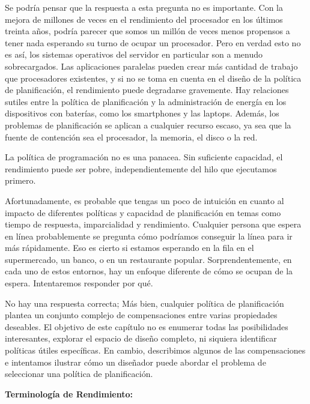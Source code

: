 \documentclass[10pt]{book}
\begin{document}
Se podría pensar que la respuesta a esta pregunta no es importante. Con la mejora de millones de veces en el rendimiento del procesador en los últimos treinta años, podría parecer que somos un millón de veces menos propensos a tener nada esperando su turno de ocupar un procesador. Pero en verdad esto no es así, los sistemas operativos del servidor en particular son a menudo sobrecargados. Las aplicaciones paralelas pueden crear más cantidad de trabajo que procesadores existentes, y si no se toma en cuenta en el diseño de la política de planificación, el rendimiento puede degradarse gravemente. Hay relaciones sutiles entre la política de planificación y la administración de energía en los dispositivos con baterías, como los smartphones y las laptops. Además, los problemas de planificación se aplican a cualquier recurso escaso, ya sea que la fuente de contención sea el procesador, la memoria, el disco o la red.

La política de programación no es una panacea. Sin suficiente capacidad, el rendimiento puede ser pobre, independientemente del hilo que ejecutamos primero.

Afortunadamente, es probable que tengas un poco de intuición en cuanto al impacto de diferentes políticas y capacidad de planificación en temas como tiempo de respuesta, imparcialidad y rendimiento. Cualquier persona que espera en línea probablemente se pregunta cómo podríamos conseguir la línea para ir más rápidamente. Eso es cierto si estamos esperando en la fila en el supermercado, un banco, o en un restaurante popular. Sorprendentemente, en cada uno de estos entornos, hay un enfoque diferente de cómo se ocupan de la espera. Intentaremos responder por qué.

No hay una respuesta correcta; Más bien, cualquier política de planificación plantea un conjunto complejo de compensaciones entre varias propiedades deseables. El objetivo de este capítulo no es enumerar todas las posibilidades interesantes, explorar el espacio de diseño completo, ni siquiera identificar políticas útiles específicas. En cambio, describimos algunos de las compensaciones e intentamos ilustrar cómo un diseñador puede abordar el problema de seleccionar una política de planificación.

\textbf{Terminología de Rendimiento:}
\end{document}
